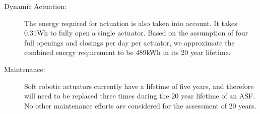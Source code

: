 \begin{description}
\begin{figure}[H]
\begin{center}
\end{center}
\end{figure}


\item[Dynamic Actuation: ] The energy required for actuation is also taken into account. It takes 0.31Wh to fully open a single actuator. Based on the assumption of four full openings and closings per day per actuator, we approximate the combined energy requirement to be 489kWh in its 20 year lifetime. 

\item[Maintenance: ] Soft robotic actuators currently have a lifetime of five years, and therefore will need to be replaced three times during the 20 year lifetime of an ASF. No other maintenance efforts are considered for the assessment of 20 years.


\end{description}
